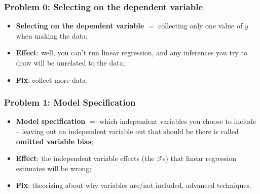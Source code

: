 \documentclass[aspectratio=169]{beamer}
\theoremstyle{principle}
\begin{document}
%
%

\begin{frame}
\frametitle{Problem 0: Selecting on the dependent variable}

\begin{itemize}
\item \textbf{Selecting on the dependent variable} $=$ collecting only one value of $y$ when making the data;
\bigskip
\bigskip

\item \textbf{Effect}: well, you can't run linear regression, and any inferences you try to draw will be unrelated to the data;
\bigskip
\bigskip

\item \textbf{Fix}: collect more data.
\end{itemize}

\end{frame}

\begin{frame}
\frametitle{Problem 1: Model Specification}
\begin{itemize}
\item \textbf{Model specification} $=$ which independent variables you choose to include -- leaving out an independent variable out that should be there is called \textbf{omitted variable bias};
\bigskip
\bigskip

\item \textbf{Effect}: the independent variable effects (the $\beta$'s) that linear regression estimates will be wrong;
\bigskip
\bigskip

\item \textbf{Fix}: theorizing about why variables are/not included, advanced techniques.
\end{itemize}
\end{frame}
\end{document}
